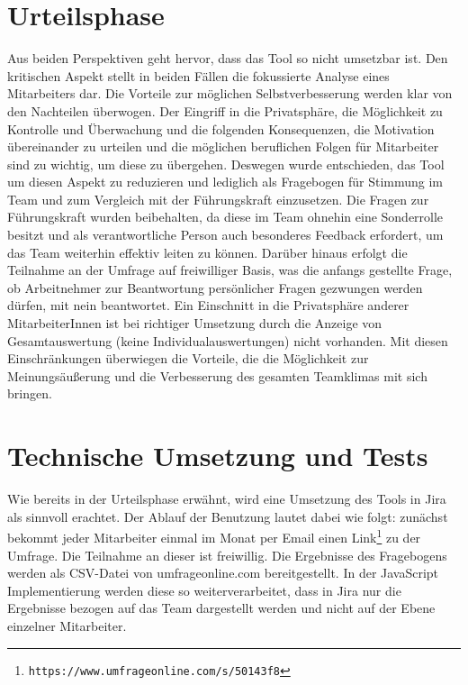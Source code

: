 \documentclass[a4paper,12pt,]{article}
\begin{document}
\section{Urteilsphase}

Aus beiden Perspektiven geht hervor, dass das Tool so nicht umsetzbar ist. Den kritischen Aspekt stellt in beiden Fällen die fokussierte Analyse eines Mitarbeiters dar. Die Vorteile zur möglichen Selbstverbesserung werden klar von den Nachteilen überwogen. Der Eingriff in die Privatsphäre, die Möglichkeit zu Kontrolle und Überwachung und die folgenden Konsequenzen, die Motivation übereinander zu urteilen und die möglichen beruflichen Folgen für Mitarbeiter sind zu wichtig, um diese zu übergehen.
Deswegen wurde entschieden, das Tool um diesen Aspekt zu reduzieren und lediglich als
Fragebogen für Stimmung im Team und zum Vergleich mit der Führungskraft einzusetzen. Die Fragen zur Führungskraft wurden beibehalten, da diese im Team ohnehin eine Sonderrolle besitzt und als verantwortliche Person auch besonderes Feedback erfordert, um das Team weiterhin effektiv leiten zu können. Darüber hinaus erfolgt die Teilnahme an der Umfrage auf freiwilliger Basis, was die anfangs gestellte Frage, ob Arbeitnehmer zur Beantwortung persönlicher Fragen gezwungen werden dürfen, mit nein beantwortet. Ein Einschnitt in die Privatsphäre anderer MitarbeiterInnen ist bei richtiger Umsetzung durch die Anzeige von Gesamtauswertung (keine Individualauswertungen) nicht vorhanden.
Mit diesen Einschränkungen überwiegen die Vorteile, die die Möglichkeit zur Meinungsäußerung und die Verbesserung des gesamten Teamklimas mit sich bringen.

\section{Technische Umsetzung und Tests}
Wie bereits in der Urteilsphase erwähnt, wird eine Umsetzung des Tools in Jira als sinnvoll erachtet. Der Ablauf der Benutzung lautet dabei wie folgt: zunächst bekommt jeder Mitarbeiter einmal im Monat per Email einen Link\footnote{\tt https://www.umfrageonline.com/s/50143f8} zu der Umfrage. Die Teilnahme an dieser ist freiwillig. Die Ergebnisse des Fragebogens werden als CSV-Datei von umfrageonline.com bereitgestellt. In der JavaScript Implementierung werden diese so weiterverarbeitet, dass in Jira nur die Ergebnisse bezogen auf das Team dargestellt werden und nicht auf der Ebene einzelner Mitarbeiter.
\end{document}
